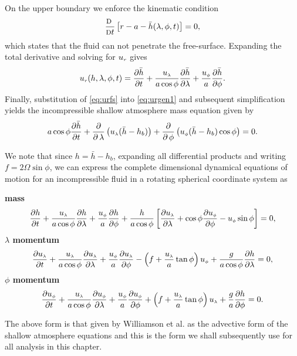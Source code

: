 On the upper boundary we enforce the kinematic condition 
\begin{equation*}
\frac{\mbox{\footnotesize D\ }}{\mbox{\footnotesize D}t}\left[r-a-\bar{h}(\lambda,\phi,t)\right]=0,
\end{equation*}which states that the fluid can not penetrate the free-surface. Expanding the total derivative and solving for $\ur$ gives
\begin{equation}
\ur(h,\lambda,\phi,t)=\dhd{t}+\frac{\ulam}{a\cos\phi}\dhd{\lambda}+\frac{\uphi}{a}\dhd{\phi}.
\label{eq:urfs}
\end{equation}
Finally, substitution of \eqref{eq:urfs} into \eqref{eq:urgen1} and subsequent simplification yields the incompressible shallow atmosphere mass equation given by
\begin{equation}
a\cos\phi\dhd{t}+\frac{\partial}{\partial \, \lambda}\left(\ulam (\bar{h}-h_b)\right) + \frac{\partial}{\partial \, \phi} \left(\uphi (\bar{h}-h_b) \cos\phi \right)=0. \label{eq:incompmass1}
\end{equation}

We note that since $h=\bar{h}-h_b$, expanding all differential products and writing $f=2\Omega\sin\phi$, we can express the complete dimensional dynamical equations of motion for an incompressible fluid in a rotating spherical coordinate system as 

{\bfseries mass}
\begin{equation}\dhdd{t}+\frac{\ulam}{a\cos\phi}\dhdd{\lambda}+\frac{\uphi}{a}\dhdd{\phi}+\frac{h}{a\cos\phi}\left[\dulamd{\lambda}+\cos\phi\duphid{\phi}-\uphi\sin\phi\right]=0, \label{eq:massincom}
\end{equation}
{\bfseries \boldmath$\lambda$ momentum}
\begin{equation}
\dulamd{t} + \frac{\ulam}{a\cos\phi} \dulamd{\lambda} + \frac{\uphi}{a}\dulamd{\phi} - \left(f + \frac{\ulam}{a}\tan\phi \right)\uphi + \frac{g}{a\cos\phi}\dhdd{\lambda} = 0, \label{eq:lamincom}
\end{equation}
{\bfseries \boldmath$\phi$ momentum}
\begin{equation}\duphid{t}+\frac{\ulam}{a\cos\phi}\duphid{\lambda}+\frac{\uphi}{a}\duphid{\phi}+\left(f+\frac{\ulam}{a}\tan\phi \right)\ulam+\frac{g}{a}\dhdd{\phi}=0. \label{eq:phiincom}
\end{equation}

The above form is that given by Williamson et al.\cite[page 213]{Williamson:STS} as the advective form of the shallow atmosphere equations and this is the form we shall subsequently use for all analysis in this chapter.

